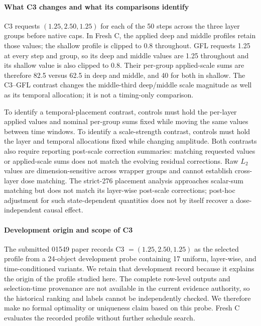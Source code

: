 \documentclass[times,twocolumn,final]{elsarticle}
\begin{document}
\paragraph{What C3 changes and what its comparisons identify}
C3 requests $(1.25,2.50,1.25)$ for each of the 50 steps across the three layer groups before native caps. In Fresh C, the applied deep and middle profiles retain those values; the shallow profile is clipped to 0.8 throughout. GFL requests 1.25 at every step and group, so its deep and middle values are 1.25 throughout and its shallow value is also clipped to 0.8. Their per-group applied-scale sums are therefore 82.5 versus 62.5 in deep and middle, and 40 for both in shallow. The C3--GFL contrast changes the middle-third deep/middle scale magnitude as well as its temporal allocation; it is not a timing-only comparison.

To identify a temporal-placement contrast, controls must hold the per-layer applied values and nominal per-group sums fixed while moving the same values between time windows. To identify a scale-strength contrast, controls must hold the layer and temporal allocations fixed while changing amplitude. Both contrasts also require reporting post-scale correction summaries: matching requested values or applied-scale sums does not match the evolving residual corrections. Raw $L_2$ values are dimension-sensitive across wrapper groups and cannot establish cross-layer dose matching. The strict-276 placement analysis approaches scalar-sum matching but does not match its layer-wise post-scale corrections; post-hoc adjustment for such state-dependent quantities does not by itself recover a dose-independent causal effect.

\paragraph{Development origin and scope of C3}
The submitted 01549 paper records C3 $=(1.25,2.50,1.25)$ as the selected profile from a 24-object development probe containing 17 uniform, layer-wise, and time-conditioned variants. We retain that development record because it explains the origin of the profile studied here. The complete row-level outputs and selection-time provenance are not available in the current evidence authority, so the historical ranking and labels cannot be independently checked. We therefore make no formal optimality or uniqueness claim based on this probe. Fresh C evaluates the recorded profile without further schedule search.
\end{document}
